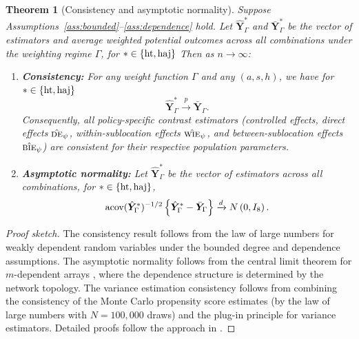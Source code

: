 \documentclass{article}
\newtheorem{theorem}{Theorem}[section]
\newcommand{\acov}{\textup{acov}}
\newcommand{\bY}{\boldsymbol{Y}}
\newcommand{\de}{\textsc{de}}
\newcommand{\bie}{\textsc{bie}}
\newcommand{\wie}{\textsc{wie}}
\newcommand{\horthom}{\textup{ht}}
\newcommand{\haj}{\textup{haj}}
\begin{document}
\begin{theorem}[Consistency and asymptotic normality]\label{thm:asymptotic}
Suppose Assumptions~\ref{ass:bounded}--\ref{ass:dependence} hold. Let $\hat{\bY}^{*}_{\Gamma}$ and $\bar{\bY}^{*}_{\Gamma}$ be the vector of estimators and average weighted potential outcomes across all combinations under the weighting regime $\Gamma$, for $*\in\{\horthom, \haj\}$ Then as $n \to \infty$:
\begin{enumerate}
    \item \textbf{Consistency:} For any weight function $\Gamma$ and any $(a,s,h)$, we have for $*\in\{\horthom, \haj\}$
    \begin{equation*}
    \hat{\bY}^{*}_\Gamma\xrightarrow{p} \bar{\bY}_\Gamma.
    \end{equation*}
    Consequently, all policy-specific contrast estimators (controlled effects, direct effects $\hat{\de}_{\psi}$, within-sublocation effects $\hat{\wie}_{\psi}$, and between-sublocation effects $\hat{\bie}_{\psi}$) are consistent for their respective population parameters.
    
    \item \textbf{Asymptotic normality:} Let $\hat{\bY}^{*}_{\Gamma}$ be the vector of estimators across all combinations, for $*\in\{\horthom, \haj\}$, 
    \begin{equation*}
    \acov(\hat{\bY}^{*}_{\Gamma})^{-1/2}\left\{\hat{\bY}^{*}_{\Gamma} - \bar{\bY}_\Gamma\right\} \xrightarrow{d} N\left(0, I_8\right).
    \end{equation*}

\end{enumerate}
\end{theorem}

\begin{proof}[Proof sketch]
The consistency result follows from the law of large numbers for weakly dependent random variables under the bounded degree and dependence assumptions. The asymptotic normality follows from the central limit theorem for $m$-dependent arrays \citep{chen2004normal}, where the dependence structure is determined by the network topology. The variance estimation consistency follows from combining the consistency of the Monte Carlo propensity score estimates (by the law of large numbers with $N = 100{,}000$ draws) and the plug-in principle for variance estimators. Detailed proofs follow the approach in \citet{aronow2017estimating}.
\end{proof}
\end{document}
